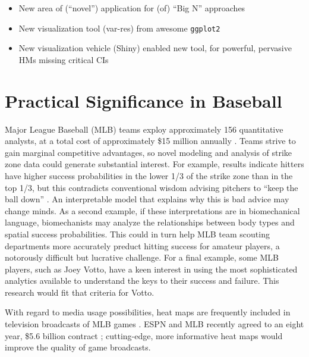 
\begin{itemize}
\item New area of (``novel'') application for (of) ``Big N'' approaches
\item New visualization tool (var-res) from awesome \verb|ggplot2|
\item New visualization vehicle (Shiny) enabled new tool, for powerful, pervasive HMs missing critical CIs
\end{itemize}

\section{Practical Significance in Baseball}

Major League Baseball (MLB\textsuperscript{\textregistered}) teams exploy approximately 156 quantitative analysts, at a total cost of approximately \$15 million annually \citep{Lindbergh2016}. Teams strive to gain marginal competitive advantages, so novel modeling and analysis of strike zone data could generate substantial interest. For example, results indicate hitters have higher success probabilities in the lower 1/3 of the strike zone than in the top 1/3, but this contradicts conventional wisdom advising pitchers to ``keep the ball down'' \citep{Stallings2003}. An interpretable model that explains why this is bad advice may change minds. As a second example, if these interpretations are in biomechanical language, biomechanists may analyze the relationships between body types and spatial success probabilities. This could in turn help MLB\textsuperscript{\textregistered} team scouting departments more accurately preduct hitting success for amateur players, a notorously difficult but lucrative challenge. For a final example, some MLB\textsuperscript{\textregistered} players, such as Joey Votto, have a keen interest in using the most sophisticated analytics available to understand the keys to their success and failure\citep{Daugherty2015}. This research would fit that criteria for Votto.

With regard to media usage possibilities, heat maps are frequently included in television broadcasts of MLB\textsuperscript{\textregistered} games \citep{Cross2015}. ESPN\textsuperscript{\textregistered} and MLB\textsuperscript{\textregistered} recently agreed to an eight year, \$5.6 billion contract \citep{Newman2012}; cutting-edge, more informative heat maps would improve the quality of game broadcasts.

